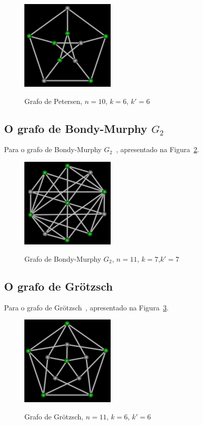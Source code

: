 \begin{figure}[htb]
\centering
\includegraphics[width=0.4\textwidth]{img/petersen.png}
\label{fig:example-petersen}
\caption{Grafo de Petersen, $n=10$, $k=6$, $k'=6$}
\end{figure}


\subsection{O grafo de Bondy-Murphy $G_2$}
Para o grafo de Bondy-Murphy $G_2$~\cite{cite:example-bondy},
apresentado na Figura~\ref{fig:example-bondymurphyg2}.

\begin{figure}[htb]
\centering
\includegraphics[width=0.4\textwidth]{img/bondymurphyg2.png}
\label{fig:example-bondymurphyg2}
\caption{Grafo de Bondy-Murphy $G_2$, $n=11$, $k=7$,$k'=7$}
\end{figure}


\subsection{O grafo de Grötzsch}
Para o grafo de Grötzsch~\cite{cite:example-grotzsch},
apresentado na Figura~\ref{fig:example-grotzsch}.

\begin{figure}[htb]
\centering
\includegraphics[width=0.4\textwidth]{img/grotzsch.png}
\label{fig:example-grotzsch}
\caption{Grafo de Grötzsch, $n=11$, $k=6$, $k'=6$}
\end{figure}


